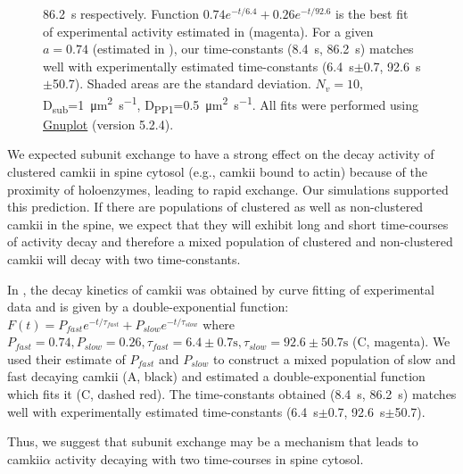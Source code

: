 \documentclass[9pt,lineno,doublespacing]{elife}
\newcommand\SUB[2]{#1\textsubscript{#2}}
\begin{document}
\begin{figure}
{        \SI{86.2}{\second} respectively. 
        Function $0.74e^{-t/6.4}+0.26e^{-t/92.6}$ is the best fit of
        experimental activity estimated in \citep{chang_camkii_2017} (magenta). 
        For a given $a=0.74$ (estimated in \citep{chang_camkii_2017}), our time-constants
        (\SI{8.4}{\second}, \SI{86.2}{\second}) matches well with experimentally
        estimated time-constants (\SI{6.4}{\second}$\pm$0.7, \SI{92.6}{\second}$\pm$50.7). 
        Shaded areas are the standard deviation. $N_{v}=10$,
        \SUB{D}{sub}=\SI{1}{\micro\meter\squared\per\second},
        \SUB{D}{PP1}=\SI{0.5}{\micro\meter\squared\per\second}.
        All fits were performed using 
        \href{https://gnuplot.info}{Gnuplot} (version 5.2.4).
    }\label{fig:cytosol_integrator}
\end{figure}

We expected subunit exchange to have a strong effect on the decay activity of
clustered \gls{camkii} in spine cytosol (e.g., \gls{camkii} bound to actin)
because of the proximity of holoenzymes, leading to rapid exchange.  Our
simulations supported this prediction. If there are populations of clustered as
well as non-clustered \gls{camkii} in the spine, we expect that they will
exhibit long and short time-courses of activity decay and therefore a mixed
population of clustered and non-clustered \gls{camkii} will decay with two
time-constants. 

In \citep{chang_camkii_2017}, the decay kinetics of \gls{camkii} was obtained by
curve fitting of experimental data and is given by a double-exponential
function: $F(t)=P_{fast}e^{-t/\tau_{fast}}+P_{slow}e^{-t/\tau_{slow}}$ where
$P_{fast}=0.74, P_{slow}=0.26,  \tau_{fast}= 6.4\pm0.7 \si{\second},
\tau_{slow}=92.6 \pm 50.7\si{\second}$ (C, magenta).  We
used their estimate of $P_{fast}$ and $P_{slow}$ to construct a mixed population
of slow and fast decaying \gls{camkii} (A, black) and
estimated a double-exponential function which fits it
(C, dashed red). The time-constants obtained
(\SI{8.4}{\second}, \SI{86.2}{\second}) matches well with experimentally
estimated time-constants (\SI{6.4}{\second}$\pm$0.7,
\SI{92.6}{\second}$\pm$50.7). 

Thus, we suggest that subunit exchange may be a mechanism that leads to
\gls{camkii}$\alpha$ activity decaying with two time-courses in spine 
cytosol.
\end{document}
